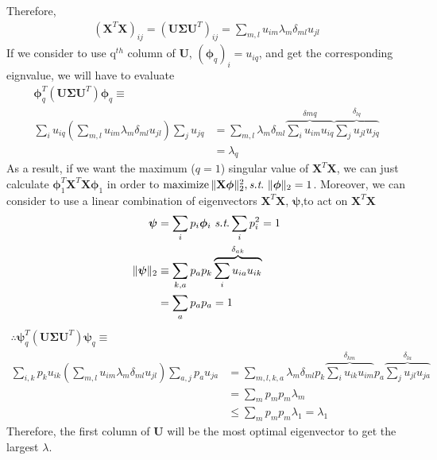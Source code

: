 \documentclass[11pt]{article}
\newcommand{\maximize}{\operatorname*{maximize}}
\newcommand{\mtx}[1]{\mathbf{#1}}
\def \mU {\mtx{U}}
\def \mSigma {\mtx{\Sigma}}
\def \mX {\mtx{X}}
\begin{document}
	Therefore,
	\begin{align*}
	\left(\mX^T\mX\right)_{ij}=\left(\mU\mSigma\mU^T\right)_{ij}=\sum_{m,l}u_{im}\lambda_{m}\delta_{ml}u_{jl}
	\end{align*}
	If we consider to use q$^{th}$ column of $\mU$, $(\bm{\phi}_{q})_{i}=u_{iq}$, and get the corresponding eignvalue, we will have to evaluate
	\begin{align*}
	\bm{\phi}_q^T\left(\mU\mSigma\mU^T\right)\bm{\phi}_q\equiv \\
	\sum_{i}u_{iq}\left(\sum_{m,l}u_{im}\lambda_{m}\delta_{ml}u_{jl}\right)\sum_{j}u_{jq}&=\sum_{m,l}\lambda_{m}\delta_{ml}\overbrace{\sum_{i}u_{im}u_{iq}}^{\delta{mq}}\overbrace{\sum_{j}u_{jl}u_{jq}}^{\delta_{lq}}\\
	&=\lambda_q
	\end{align*}
	As a result, if we want the maximum ($q=1$) singular value of $\mX^T\mX$, we can just calculate $\bm{\phi}_1^T\mX^T\mX\bm{\phi}_1$ in order to $\maximize \|\mX \bm{\phi}\|^2_2, \st \ \|\bm{\phi}\|_2=1$. Moreover, we can consider to use a linear combination of eigenvectors $\mX^T\mX$, $\bm{\psi}$,to act on $\mX^T\mX$
	\begin{align*}
	\bm{\psi}&=\sum_{i}p_i\bm{\phi}_i \ \st \sum_{i}p_i^2=1\\
	\|\bm{\psi}\|_2 & \equiv
	\sum_{k,a}p_a p_k \overbrace{\sum_{i}u_{ia}u_{ik}}^{\delta_{ak}}\\
	&=\sum_{a}p_a p_a=1
	\end{align*}
	\begin{align*}
	\therefore \bm{\psi}_q^T\left(\mU\mSigma\mU^T\right)\bm{\psi}_q\equiv\\
	\sum_{i,k}p_k u_{ik} \left(\sum_{m,l}u_{im}\lambda_{m}\delta_{ml}u_{jl}\right) \sum_{a,j}p_a u_{ja}&=\sum_{m,l,k,a}\lambda_m\delta_{ml}p_k\overbrace{\sum_{i}u_{ik}u_{im}}^{\delta_{km}}p_a\overbrace{\sum_{j}u_{jl}u_{ja}}^{\delta_{la}}\\
	&=\sum_{m}p_m p_m\lambda_m\\
	&\leq \sum_{m}p_m p_m\lambda_{1}=\lambda_1
	\end{align*}
	Therefore, the first column of $\mU$ will be the most optimal eigenvector to get the largest $\lambda$.
\end{document}
